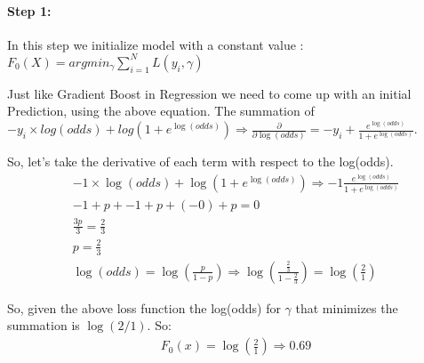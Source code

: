 \documentclass[12pt, a4paper]{article} %
\begin{document}
\paragraph{Step 1:} In this step we initialize model with a constant value : $F_{0}(X) = argmin_{\gamma} \sum^{N}_{i = 1} L(y_{i}, \gamma)$

Just like Gradient Boost in Regression we need to come up with an initial Prediction, using the above equation. The summation of $-y_{i} \times log(odds) + log(1 + e^{\log(odds)}) \Rightarrow \frac{\partial}{\partial \log(odds)} = -y_{i} + \frac{e^{\log(odds)}}{1 + e^{\log(odds)}}$.

So, let's take the derivative of each term with respect to the log(odds).
\begin{align*}
    & - 1 \times \log(odds) + \log(1 + e^{\log(odds)}) \Rightarrow -1 \frac{e^{\log(odds)}}{1 + e^{\log(odds)}}\\
    & -1 + p + -1 + p + (-0) + p = 0\\
    & \frac{3p}{3} = \frac{2}{3}\\
    & p = \frac{2}{3}\\
    & \log(odds) = \log(\frac{p}{1 - p}) \Rightarrow \log(\frac{\frac{2}{3}}{1 - \frac{2}{3}}) = \log(\frac{2}{1})
\end{align*}

So, given the above loss function the log(odds) for $\gamma$ that minimizes the summation is $\log(2/1)$. So:
\begin{align*}
    & F_{0}(x) = \log(\frac{2}{1}) \Rightarrow 0.69\\
\end{align*}




\newpage

\end{document}
